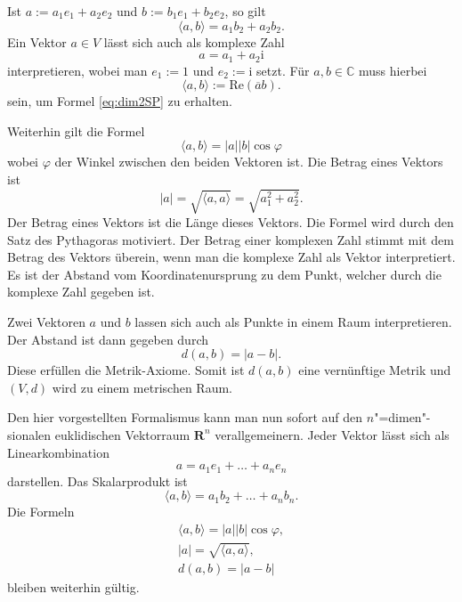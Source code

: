 \documentclass[a4paper,10pt,fleqn,twocolumn,twoside]{article}
\newcommand{\ui}{\mathrm i}
\newcommand{\C}{\mathbb C}
\begin{document}
Ist $a:=a_1 e_1+a_2e_2$ und $b:=b_1 e_1+b_2 e_2$, so gilt
\begin{equation}\label{eq:dim2SP}
\langle a,b\rangle = a_1b_2+a_2 b_2.
\end{equation}
Ein Vektor $a\in V$ lässt sich auch als komplexe Zahl
\begin{equation}
a = a_1+a_2\ui
\end{equation}
interpretieren, wobei man $e_1:=1$ und $e_2:=\ui$ setzt.
Für $a,b\in\C$ muss hierbei
\begin{equation}
\langle a,b\rangle := \mathrm{Re}(\overline ab).
\end{equation}
sein, um Formel \eqref{eq:dim2SP} zu erhalten.

Weiterhin gilt die Formel
\begin{equation}
\langle a, b\rangle
= |a||b|\cos\varphi
\end{equation}
wobei $\varphi$ der Winkel zwischen den beiden Vektoren ist.
Die Betrag eines Vektors ist
\begin{equation}
|a| = \sqrt{\langle a,a\rangle}
= \sqrt{a_1^2+a_2^2}.
\end{equation}
Der Betrag eines Vektors ist die Länge dieses Vektors. Die Formel wird
durch den Satz des Pythagoras motiviert. Der Betrag einer komplexen
Zahl stimmt mit dem Betrag des Vektors überein, wenn man die komplexe
Zahl als Vektor interpretiert. Es ist der Abstand vom
Koordinatenursprung zu dem Punkt, welcher durch die komplexe Zahl
gegeben ist.

Zwei Vektoren $a$ und $b$ lassen sich auch als Punkte in einem
Raum interpretieren. Der Abstand ist dann gegeben durch
\begin{equation}
d(a,b) = |a-b|.
\end{equation}
Diese erfüllen die Metrik-Axiome. Somit ist $d(a,b)$ eine
vernünftige Metrik und $(V,d)$ wird zu einem metrischen Raum.

Den hier vorgestellten Formalismus kann man nun sofort auf den
$n$"=dimen"-sionalen euklidischen Vektorraum $\mathbf{R}^n$
verallgemeinern. Jeder Vektor lässt sich als Linearkombination
\[a = a_1 e_1+\dots+a_n e_n\]
darstellen. Das Skalarprodukt ist
\[\langle a,b\rangle = a_1b_2+\dots+a_nb_n.\]
Die Formeln
\begin{gather}
\langle a,b\rangle = |a||b|\cos\varphi,\\
|a| = \sqrt{\langle a,a\rangle},\\
d(a,b) = |a-b|
\end{gather}
bleiben weiterhin gültig.
\end{document}
